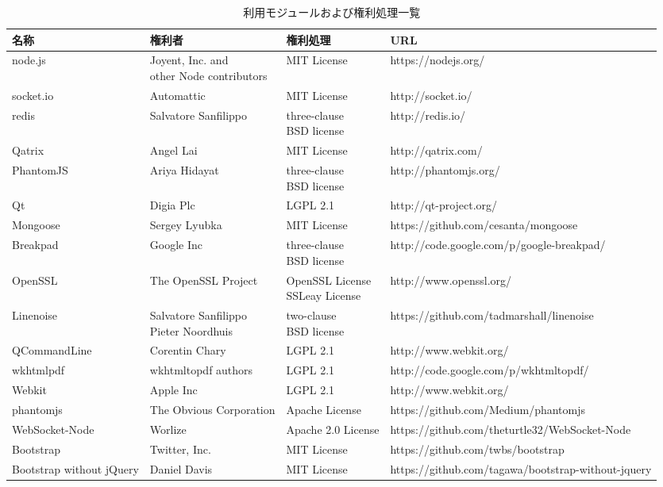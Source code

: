 \documentclass[a4paper,10pt,oneside]{jsbook}
\begin{document}
\begin{table}[htbp]
\begin{center}
\caption{利用モジュールおよび権利処理一覧}
\label{ops}
\begin{tabular}{|l|l|l|l|}
\hline
名称 & 権利者 & 権利処理 & URL \\
\hline
\hline
node.js & \shortstack[l]{Joyent, Inc. and \\ other Node contributors} & MIT License & https://nodejs.org/ \\
\hline
socket.io & Automattic & MIT License & http://socket.io/  \\
\hline
redis & Salvatore Sanfilippo & \shortstack[l]{three-clause\\BSD license} & http://redis.io/ \\
\hline
Qatrix & Angel Lai &  MIT License & http://qatrix.com/\\
\hline
PhantomJS & Ariya Hidayat & \shortstack[l]{three-clause\\BSD license}  & http://phantomjs.org/\\
\hline
Qt & Digia Plc  & LGPL 2.1 & http://qt-project.org/\\
\hline
Mongoose & Sergey Lyubka  & MIT License & https://github.com/cesanta/mongoose\\
\hline
Breakpad & Google Inc & \shortstack[l]{three-clause\\BSD license} & http://code.google.com/p/google-breakpad/\\
\hline
OpenSSL & The OpenSSL Project & \shortstack[l]{OpenSSL License\\SSLeay License} & http://www.openssl.org/\\
\hline
Linenoise & \shortstack[l]{Salvatore Sanfilippo\\Pieter Noordhuis} & \shortstack[l]{two-clause\\BSD license} & https://github.com/tadmarshall/linenoise\\
\hline
QCommandLine & Corentin Chary  & LGPL 2.1 & http://www.webkit.org/\\
\hline
wkhtmlpdf & wkhtmltopdf authors & LGPL 2.1 & http://code.google.com/p/wkhtmltopdf/\\
\hline
Webkit & Apple Inc  & LGPL 2.1 & http://www.webkit.org/\\
\hline
phantomjs & The Obvious Corporation & Apache License & https://github.com/Medium/phantomjs\\
\hline
WebSocket-Node & Worlize & Apache 2.0 License & https://github.com/theturtle32/WebSocket-Node\\
\hline
Bootstrap & Twitter, Inc. &  MIT License & https://github.com/twbs/bootstrap\\
\hline
Bootstrap without jQuery & Daniel Davis &  MIT License & https://github.com/tagawa/bootstrap-without-jquery\\
\hline

\end{tabular}
\end{center}
\end{table}
\end{document}
